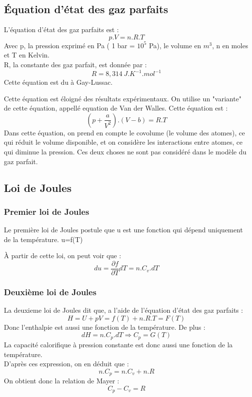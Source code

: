 \subsection{Équation d'état des gaz parfaits}
\begin{de}
L'équation d'état des gaz parfaits est : 
$$p.V = n.R.T$$
Avec p, la pression exprimé en Pa ( 1 bar = $10^5$ Pa), le volume en $m^3$, n en moles et T en Kelvin.\\
R, la constante des gaz parfait, est donnée par :
$$R = 8,314~ J.K^{-1}.mol^{-1}$$
Cette équation est du à Gay-Lussac.
\end{de}
\begin{de}
Cette équation est éloigné des résultats expérimentaux. On utilise un "variante" de cette équation, appellé equation de Van der Walles. Cette équation est : 
$$\left( p + \dfrac{a}{V^2}\right).(V-b) = R.T$$
Dans cette équation, on prend en compte le covolume (le volume des atomes), ce qui réduit le volume disponible, et on considère les interactions entre atomes, ce qui diminue la pression. Ces deux choses ne sont pas considéré dans le modèle du gaz parfait.
\end{de}
\subsection{Loi de Joules}
\subsubsection{Premier loi de Joules}
\begin{enon}
Le première loi de Joules postule que u est une fonction qui dépend uniquement de la température. u=f(T)
\end{enon}
\begin{prop}
À partir de cette loi, on peut voir que : 
$$du = \dfrac{\partial f}{\partial T}dT = n.C_v.dT$$
\end{prop}
\subsubsection{Deuxième loi de Joules}
\begin{enon}
La deuxieme loi de Joules dit que, a l'aide de l'équation d'état des gaz parfaits : 
$$H = U + pV = f(T) + n.R.T = F(T)$$
Donc l'enthalpie est aussi une fonction de la température. De plus :
$$dH = n.C_p.dT \Rightarrow C_p = G(T)$$
La capacité calorifique à pression constante est donc aussi une fonction de la température.\\
D'après ces expression, on en déduit que : 
$$n.C_p = n.C_v + n.R$$
On obtient donc la relation de Mayer :
$$C_p - C_v = R$$
\end{enon}
